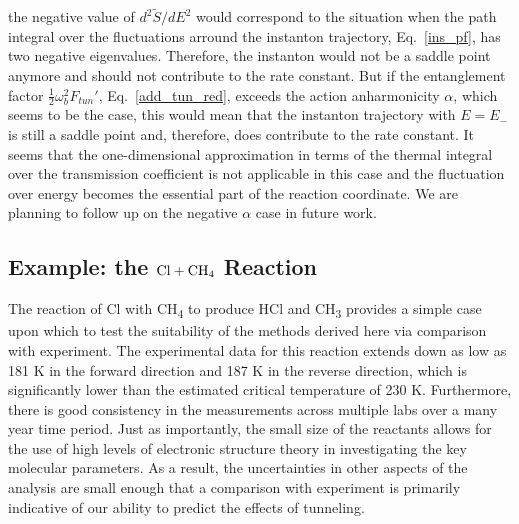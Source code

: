 \documentclass[journal=jpcafh,manuscript=article]{achemso}
\begin{document}
the negative value of $d^2\tilde{S}/dE^2$ would correspond to the
situation when the path integral over the fluctuations arround the
instanton trajectory, Eq.~\ref{ins_pf}, has two negative
eigenvalues. Therefore, the instanton would not be a saddle point
anymore and should not contribute to the rate constant. But
if the entanglement factor $\frac{1}{2}\omega_b^2F_{tun}'$,
Eq.~\ref{add_tun_red}, exceeds the action anharmonicity $\alpha$,
which seems to be the case, this would mean that the instanton
trajectory with $E=E_-$ is still a saddle point and, therefore, does
contribute to the rate constant. It seems that the
one-dimensional approximation in terms of the thermal integral over the
transmission coefficient is not applicable in this case and the
fluctuation over energy becomes the essential part of the reaction
coordinate. We are planning to follow up on the negative $\alpha$ case
in future work.

\subsection{Example: the $\rm Cl+CH_4$ Reaction}
The reaction of Cl with CH\textsubscript{4} to produce HCl and
CH\textsubscript{3} provides a simple case upon which to test the
suitability of the methods derived here via comparison with experiment.
The experimental data for this reaction extends down as low as 181 K in
the forward direction\cite{seely96} and 187 K in the reverse direction,\cite{eskola06} which is
significantly lower than the estimated critical temperature of 230 K.
Furthermore, there is good consistency in the measurements across
multiple labs over a many year time period. Just as importantly, the
small size of the reactants allows for the use of high levels of
electronic structure theory in investigating the key molecular
parameters. As a result, the uncertainties in other aspects of the
analysis are small enough that a comparison with experiment is primarily
indicative of our ability to predict the effects of tunneling.
\end{document}
